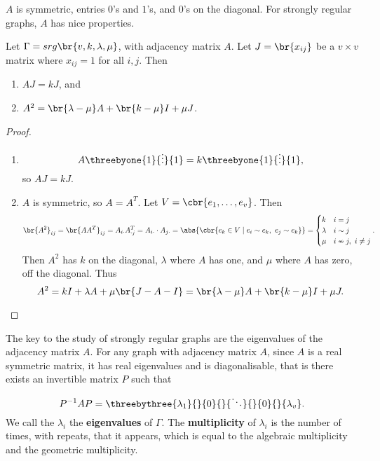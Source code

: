 $ A $ is symmetric, entries $ 0 $'s and $ 1 $'s, and $ 0 $'s on the diagonal. For strongly regular graphs, $ A $ has nice properties.

\begin{proposition}
\label{prop:2.6}
Let $ \Gamma = srg\br{v, k, \lambda, \mu} $, with adjacency matrix $ A $. Let $ J = \br{x_{ij}} $ be a $ v \times v $ matrix where $ x_{ij} = 1 $ for all $ i, j $. Then
\begin{enumerate}
\item $ AJ = kJ $, and
\item $ A^2 = \br{\lambda - \mu}A + \br{k - \mu}I + \mu J $.
\end{enumerate}
\end{proposition}

\begin{proof}
\hfill
\begin{enumerate}
\item
$$ A\threebyone{1}{\vdots}{1} = k\threebyone{1}{\vdots}{1}, $$
so $ AJ = kJ $.
\item $ A $ is symmetric, so $ A = A^T $. Let $ V = \cbr{e_1, \dots, e_v} $. Then
$$ \br{A^2}_{ij} = \br{AA^T}_{ij} = A_{i\cdot}A_{\cdot j}^T = A_{i\cdot} \cdot A_{j\cdot} = \abs{\cbr{e_k \in V \mid e_i \sim e_k, \ e_j \sim e_k}} =
\begin{cases}
k & i = j \\
\lambda & i \sim j \\
\mu & i \nsim j, \ i \ne j
\end{cases}.
$$
Then $ A^2 $ has $ k $ on the diagonal, $ \lambda $ where $ A $ has one, and $ \mu $ where $ A $ has zero, off the diagonal. Thus
$$ A^2 = kI + \lambda A + \mu\br{J - A - I} = \br{\lambda - \mu}A + \br{k - \mu}I + \mu J. $$
\end{enumerate}
\end{proof}

The key to the study of strongly regular graphs are the eigenvalues of the adjacency matrix $ A $. For any graph with adjacency matrix $ A $, since $ A $ is a real symmetric matrix, it has real eigenvalues and is diagonalisable, that is there exists an invertible matrix $ P $ such that
$$ P^{-1}AP = \threebythree{\lambda_1}{}{0}{}{\ddots}{}{0}{}{\lambda_v}. $$
We call the $ \lambda_i $ the \textbf{eigenvalues} of $ \Gamma $. The \textbf{multiplicity} of $ \lambda_i $ is the number of times, with repeats, that it appears, which is equal to the algebraic multiplicity and the geometric multiplicity.

\pagebreak

